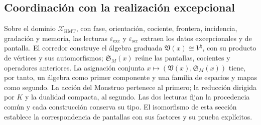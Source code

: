 \subsection{Coordinación con la realización excepcional}

Sobre el dominio \(\mathcal X_{\mathrm{HMT}}\), con fase, orientación,
cociente, frontera, incidencia, gradación y memoria, las lecturas
\(\varepsilon_{\mathrm{exc}}\) y \(\varepsilon_{\mathrm{scr}}\) extraen
los datos excepcionales y de pantalla. El corredor construye el álgebra
graduada \(\mathfrak V(x)\cong V^\natural\), con su producto de vértices
y sus automorfismos; \(\mathfrak S_M(x)\) reúne las pantallas, cocientes
y operadores anteriores. La asignación conjunta
\(x\mapsto(\mathfrak V(x),\mathfrak S_M(x))\) tiene, por tanto, un
álgebra como primer componente y una familia de espacios y mapas como segundo.
La acción del Monstruo pertenece al primero; la reducción dirigida por \(K\)
y la dualidad compacta, al segundo. Las dos lecturas fijan la procedencia
común y cada construcción conserva su tipo.
El isomorfismo de esta sección establece la correspondencia de
pantallas con sus factores y su prueba
explícitos.

